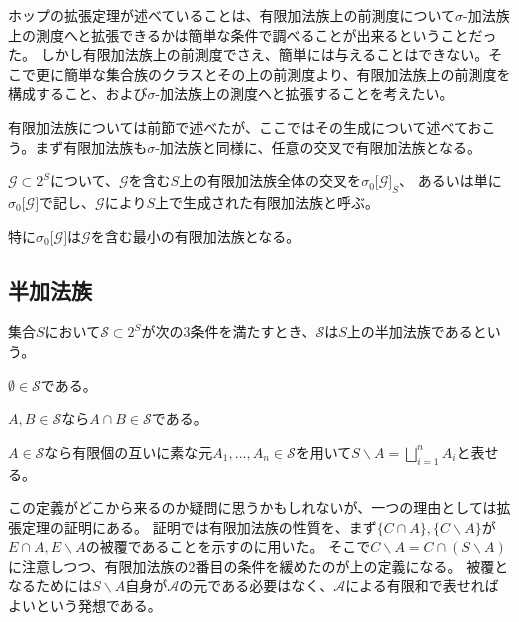 \documentclass[../root.tex]{subfiles}
\begin{document}
ホップの拡張定理が述べていることは、有限加法族上の前測度について$ \sigma $-加法族上の測度へと拡張できるかは簡単な条件で調べることが出来るということだった。
しかし有限加法族上の前測度でさえ、簡単には与えることはできない。そこで更に簡単な集合族のクラスとその上の前測度より、有限加法族上の前測度を構成すること、および$ \sigma $-加法族上の測度へと拡張することを考えたい。

有限加法族については前節で述べたが、ここではその生成について述べておこう。まず有限加法族も$ \sigma $-加法族と同様に、任意の交叉で有限加法族となる。

\begin{Def}{}{}
$ \mathscr{G}\subset 2^{S} $について、$ \mathscr{G} $を含む$ S $上の有限加法族全体の交叉を$ \sigma_{0}\lbrack \mathscr{G} \rbrack_{S} $、
あるいは単に$ \sigma_{0}\lbrack \mathscr{G} \rbrack $で記し、$ \mathscr{G} $により$ S $上で生成された有限加法族と呼ぶ。
\end{Def}{}{}

特に$ \sigma_{0}\lbrack \mathscr{G} \rbrack $は$ \mathscr{G} $を含む最小の有限加法族となる。




\subsection{半加法族}
\begin{Def}{}{}
集合$ S $において$ \mathscr{S}\subset 2^{S} $が次の3条件を満たすとき、$ \mathscr{S} $は$ S $上の半加法族であるという。
\begin{EnumCond}
\item $ \emptyset\in\mathscr{S} $である。
\item $ A, B\in\mathscr{S} $なら$ A\cap B\in\mathscr{S} $である。
\item $ A\in\mathscr{S} $なら有限個の互いに素な元$ A_{1}, \dotsc, A_{n}\in\mathscr{S} $を用いて$ S\backslash A=\bigsqcup_{i=1}^{n}A_{i} $と表せる。
\end{EnumCond}
\end{Def}

この定義がどこから来るのか疑問に思うかもしれないが、一つの理由としては拡張定理の証明にある。
証明では有限加法族の性質を、まず$ \lbrace C\cap A \rbrace, \lbrace C\backslash A \rbrace $が$ E\cap A, E\backslash A $の被覆であることを示すのに用いた。
そこで$ C\backslash A=C\cap( S\backslash A ) $に注意しつつ、有限加法族の2番目の条件を緩めたのが上の定義になる。
被覆となるためには$ S\backslash A $自身が$ \mathscr{A} $の元である必要はなく、$ \mathscr{A} $による有限和で表せればよいという発想である。
\end{document}
